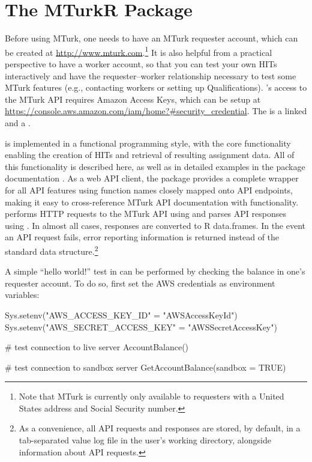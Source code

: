 \section{The MTurkR Package}
Before using MTurk, one needs to have an MTurk requester account, which can be created at \url{http://www.mturk.com}.\footnote{Note that MTurk is currently only available to requesters with a United States address and Social Security number.} It is also helpful from a practical perspective to have a worker account, so that you can test your own HITs interactively and have the requester--worker relationship necessary to test some MTurk features (e.g., contacting workers or setting up Qualifications). 's access to the MTurk API requires Amazon Access Keys, which can be setup at \url{https://console.aws.amazon.com/iam/home?#security_credential}. The  is a linked  and a .

 is implemented in a functional programming style, with the core functionality enabling the creation of HITs and retrieval of resulting assignment data. All of this functionality is described here, as well as in detailed examples in the  package documentation \citep{Leeper2012c}. As a web API client, the package provides a complete wrapper for all API features using function names closely mapped onto API endpoints, making it easy to cross-reference MTurk API documentation with  functionality.  performs HTTP requests to the MTurk API using  \citep{Ooms2015} and parses API responses using  \citep{TempleLang2012b}. In almost all cases, responses are converted to R data.frames. In the event an API request fails, error reporting information is returned instead of the standard data structure.\footnote{As a convenience, all API requests and responses are stored, by default, in a tab-separated value log file in the user's working directory, alongside information about API requests.}

A simple ``hello world!'' test in  can be performed by checking the balance in one's requester account. To do so, first set the AWS credentials as environment variables:

\begin{example}
Sys.setenv("AWS_ACCESS_KEY_ID" = "AWSAccessKeyId")
Sys.setenv("AWS_SECRET_ACCESS_KEY" = "AWSSecretAccessKey")

# test connection to live server
AccountBalance()

# test connection to sandbox server
GetAccountBalance(sandbox = TRUE)
\end{example}


